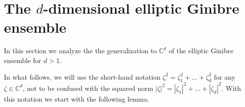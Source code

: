 \documentclass[%
 jmp,
cp,  %
 amsmath,amsthm,amssymb,%
 reprint,%
onecolumn]{revtex4-2}
\newtheorem{theorem}{Theorem}[section]
\begin{document}
%
%
%
%
%
%
%
%

\section{The $d$-dimensional elliptic Ginibre ensemble} \label{sec:general}

In this section we analyze the the generalization to $\mathbb C^d$ of the elliptic Ginibre ensemble for $d >1$.  

In what follows, we will use the short-hand notation $\zeta^2 = \zeta_1^2+\ldots+\zeta_d^2$ for any $\zeta\in\mathbb C^d$, not to be confused with the squared norm $\lvert \zeta\rvert^2 = |\zeta_1|^2+\ldots+|\zeta_d|^2$. With this notation we start with the following lemma. 
\end{document}
